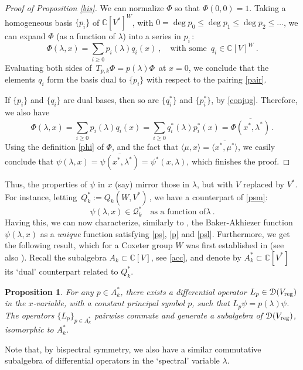 \documentclass{amsart}
\newtheorem{prop}[theorem]{Proposition}
\theoremstyle{definition}
\theoremstyle{remark}
\numberwithin{equation}{section}
\begin{document}
\begin{proof}[Proof of Proposition \ref{bis}]
We can normalize $\Phi$ so that $\Phi(0,0)=1$. Taking a homogeneous
basis $\{p_i\}$ of ${\mathbb{C}}[V^*]^W$, with $0=\deg p_0\le\deg p_1\le\deg
p_2\le\dots$, we can expand $\Phi$ (as a function of $\lambda$) into
a series in $p_i\,$:
\begin{equation*}
    \Phi(\lambda,x)=\sum_{i\ge 0}p_i(\lambda)q_i(x)\ ,\quad\text{with some $\,q_i\in{\mathbb{C}}[V]^W$}\ .
\end{equation*}
Evaluating both sides of $\,T_{p,k}\Phi=p(\lambda)\Phi\,$ at $x=0$,
we conclude that the elements $q_i$ form the basis dual
to $\{p_i\}$ with respect to the pairing \eqref{pair}.

If $\{p_i\}$ and $\{q_i\}$ are dual bases, then so are $\{q^*_i\}$
and $\{p^*_i\}$, by \eqref{conjug}. Therefore, we also have
\begin{equation*} \Phi(\lambda, x)=\sum_{i\ge
0}p_i(\lambda)q_i(x)=\sum_{i\ge
0}q^*_i(\lambda)p^*_i(x)=\overline{\Phi(x^*, \lambda^*)}\,.
\end{equation*}
Using the definition \eqref{phi} of $\Phi$, and the fact that
$\langle \mu, x\rangle=\overline{\langle x^*, \mu^* \rangle}$, we
easily conclude that $\psi(\lambda, x)=\overline{\psi(x^*,
\lambda^*)}=\psi^*(x,\lambda)$, which finishes the proof.
\end{proof}

Thus, the properties of $\psi$ in $x$ (say) mirror those in $\lambda$,
but with $V$ replaced by $V^*$. For instance, letting
$\,Q_k^* := Q_k(W, V^*)\,$, we have a counterpart of \eqref{psm}:
\begin{equation}
\label{psl}
\psi(\lambda,x)\in {\mathcal{Q}}_k^* \quad\text{as a function of
$\lambda$}\ .
\end{equation}
Having this, we can now characterize, similarly to \cite{VSC}, the
Baker-Akhiezer function $\psi(\lambda, x)$ as a {\it unique} function
satisfying \eqref{ps}, \eqref{p} and \eqref{psl}. Furthermore, we
get the following result, which for a Coxeter group $W$ was first
established in \cite{VSC} (see also \cite{CFV}). Recall the
subalgebra $A_k\subset {\mathbb{C}}[V]$, see \eqref{acc}, and denote by
$A_k^*\subset {\mathbb{C}}[V^*]$ its `dual' counterpart related to $Q_k^*$.

\begin{prop}
For any $p\in A_k^*$, there exists a differential operator
$L_p\in{\mathcal{D}}({V_{\rm{reg}}})$ in the $x$-variable, with a constant principal
symbol $p$, such that $L_p\psi=p(\lambda)\psi$. The operators
$\{L_p\}_{p\in A_k^*}$ pairwise commute and generate a subalgebra of
${\mathcal{D}}({V_{\rm{reg}}})$, isomorphic to $A_k^*$.
\end{prop}
Note that, by bispectral symmetry, we also have a similar
commutative subalgebra of differential operators in the `spectral'
variable $\lambda$.
\end{document}
